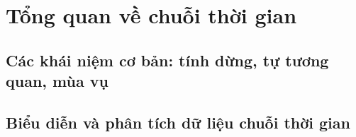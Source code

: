 \chapter{Tổng quan về chuỗi thời gian}
\section{Các khái niệm cơ bản: tính dừng, tự tương quan, mùa vụ}
\section{Biểu diễn và phân tích dữ liệu chuỗi thời gian}